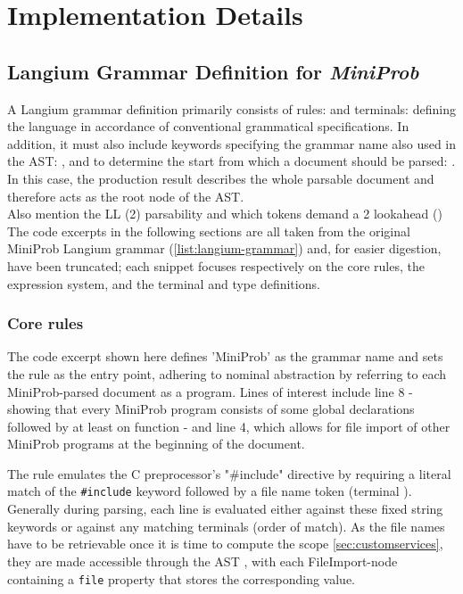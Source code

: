 \chapter{Implementation Details}
\label{sec:langium-grammar}
\section{Langium Grammar Definition for \textit{MiniProb}}

A Langium grammar definition primarily consists of rules:  and terminals:  defining the language
in accordance of conventional grammatical specifications. In addition, it must also include keywords specifying the grammar name also used in the AST: ,
and to determine the start from which a document should be parsed: .
In this case, the production result describes the whole parsable document and therefore acts as the root node of the AST.
\\
Also mention the LL (2) parsability and which tokens demand a 2 lookahead ()
The code excerpts in the following sections are all taken from the original MiniProb Langium grammar (\ref{list:langium-grammar}) and, for easier digestion,
have been truncated; each snippet focuses respectively on the core rules, the expression system, and the terminal and type definitions.
\subsection*{Core rules}

The code excerpt shown here defines 'MiniProb' as the grammar name and sets the  rule as the entry point, adhering to nominal abstraction by
referring to each MiniProb-parsed document as a program. Lines of interest include line 8 - showing that every MiniProb program consists of some global declarations
followed by at least on function - and line 4, which allows for file import of other MiniProb programs at the beginning of the document.

The  rule emulates the C preprocessor's "\#include" directive by requiring a literal match of the \texttt{\#include} keyword followed by a
file name token (terminal ). Generally during parsing, each line is evaluated either against these fixed string keywords or against any matching terminals (order of match).
As the file names have to be retrievable once it is time to compute the scope \ref{sec:customservices}, they are made accessible through the AST
, with each FileImport-node containing a \texttt{file} property that stores the corresponding value.

